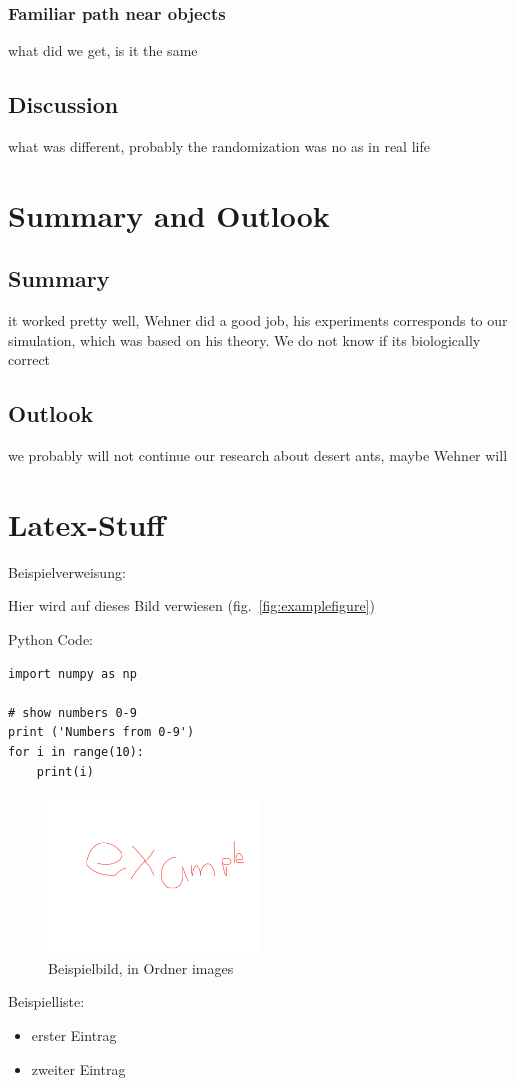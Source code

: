 \documentclass[11pt]{article}
\begin{document}
		\subsubsection{Familiar path near objects}




		what did we get, is it the same
	\subsection{Discussion}
		what was different, probably the randomization was no as in real life
\section{Summary and Outlook} %
	\subsection{Summary}
		it worked pretty well, Wehner did a good job, his experiments corresponds to our simulation, which was based on his theory. We do not know if its biologically correct
	\subsection{Outlook}
		we probably will not continue our research about desert ants, maybe Wehner will

\section{Latex-Stuff}

Beispielverweisung:

Hier wird auf dieses Bild verwiesen (fig.~\vref{fig:examplefigure})

Python Code:
\begin{lstlisting}[caption=Python code example]
import numpy as np

# show numbers 0-9
print ('Numbers from 0-9')
for i in range(10):
	print(i)
\end{lstlisting}


\begin{figure}[h!]
	\includegraphics[width=0.5\textwidth]{example.png}
	\caption{Beispielbild, in Ordner images}
	\label{fig:examplefigure}
\end{figure}

Beispielliste:

\begin{itemize}
	\item erster Eintrag
	\item zweiter Eintrag
\end{itemize}
\end{document}
